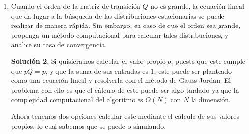 \documentclass[letterpaper]{article}
\theoremstyle{definition}
\theoremstyle{lemathm}
\theoremstyle{lemathm}
\newtheorem{sol}{Solución}
\theoremstyle{lemathm}
\theoremstyle{lemademthm}
\newcommand{\1}{\mathbbm{1}}
\begin{document}
\begin{enumerate}
		\begin{sol}
			Puesto que el Teorema de Perron-Frobenious nos indica que para una matriz no negativa existe un valor propio por la izquierda $r$ tal que es mayor o igual en valor absoluto a cualquier auto valor de ella y con el un vector propio por la izquierda con entradas no negativas, pero al ser $Q$ irreducible entonces $Q$ tiene un vector propio $q$ por la izquierda con entradas no negativas. Multiplicando a $q$ por el inverso de la suma de sus entradas obtenemos $p$. Con esto aseguramos que es una distribución y además por construcción cumple que $pQ = p$. Al tener $p$ todas sus entradas positivas entonces es posible llegar a todos los estados, es decir todos los estados son recurrentes (como lo es en una matriz irreducible).
		\end{sol}

		\item Cuando el orden de la matriz de transición $Q$ no es grande, la ecuación lineal que da lugar a la búsqueda de las distribuciones estacionarias se puede realizar de manera rápida. Sin embargo, en caso de que el orden sea grande, proponga un método computacional para calcular tales distribuciones, y analice su tasa de convergencia.
		
		\begin{sol}
			Si quisieramos calcular el valor propio $p$, puesto que este cumple que $pQ=p$, y que la suma de sus entradas es $1$, este puede ser planteado como una ecuación lineal y resolverla con el método de Gauss-Jordan. El problema con ello es que el cálculo de esto puede ser algo tardado ya que la complejidad computacional del algoritmo es $O(N)$ con $N$ la dimensión.

			Ahora tenemos dos opciones calcular este mediante el cálculo de sus valores propios, lo cual sabemos que se puede o simulando.
		\end{sol}
	\end{enumerate}
\end{document}
